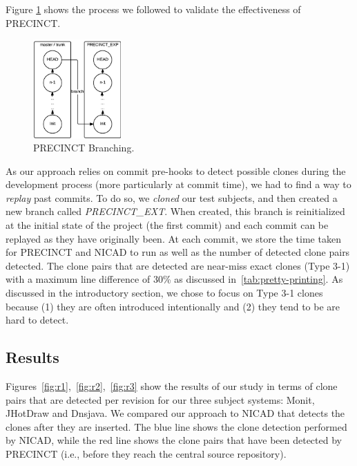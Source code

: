 \documentclass[conference]{IEEEtran}
\begin{document}
Figure \ref{fig:precinct-branching} shows the process we followed to validate the effectiveness of PRECINCT.

\begin{figure}
  \centering
    \includegraphics[width=0.3\textwidth]{media/branch.png}
    \caption{PRECINCT Branching.\label{fig:precinct-branching}}
\end{figure}

As our approach relies on commit pre-hooks to detect possible clones during the development process (more particularly at commit time), we had to find a way to \textit{replay} past commits. To do so, we  \textit{cloned} our test subjects, and then created a new branch called \textit{PRECINCT\_EXT}.
When created, this branch is reinitialized at the initial state of the project (the first commit) and each commit can be replayed as they have originally been. At each commit, we store the time taken for PRECINCT and NICAD to run as well as the number of detected clone pairs detected.
The clone pairs that are detected are near-miss exact clones (Type 3-1) with a maximum line difference of 30\% as discussed in~\ref{tab:pretty-printing}.
As discussed in the introductory section, we chose to focus on Type 3-1 clones because (1) they are often introduced  intentionally \cite{Kim2005} and (2) they tend to be are hard to detect.



\subsection{Results}
\label{sub:Results}

Figures~\ref{fig:r1},~\ref{fig:r2},~\ref{fig:r3} show the results of our study in terms of clone pairs that are detected per revision for our three subject systems: Monit, JHotDraw and Dnsjava. We compared our approach to NICAD that detects the clones after they are inserted. The blue line shows the clone detection performed by NICAD, while the red line shows the clone pairs that have been detected by PRECINCT (i.e., before they reach the central source repository).
\end{document}
